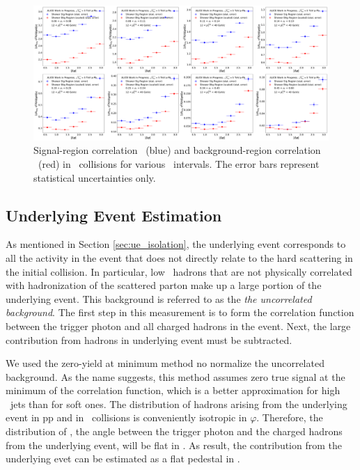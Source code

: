 \begin{figure}
  \centering
  \includegraphics[width = 1.0 \textwidth]{G-H_New/p-Pb_SR_BR_Overlay_pT_0.pdf}
  \caption{Signal-region correlation \CSR~(blue) and background-region correlation \CBR~(red) in \pPb~collisions for various \zt~intervals. The error bars represent statistical uncertainties only.}
  \label{fig:pPb_SR_BR_Overlay_pPb}
\end{figure}
\FloatBarrier


\subsection{Underlying Event Estimation}
\label{sec:ue_subtraction}
As mentioned in Section \ref{sec:ue_isolation}, the underlying event corresponds to all the activity in the event that does not directly relate to the hard scattering in the initial collision. In particular, low \pt~hadrons that are not physically correlated with hadronization of the scattered parton make up a large portion of the underlying event. This background is referred to as the \textit{the uncorrelated background}. The first step in this measurement is to form the correlation function between the trigger photon and all charged hadrons in the event. Next, the large contribution from hadrons in underlying event must be subtracted.

We used the zero-yield at minimum method no normalize the uncorrelated background. As the name suggests, this method assumes zero true signal at the minimum of the correlation function, which is a better approximation for high \pt~jets than for soft ones. The distribution of hadrons arising from the underlying event in pp and in \pPb~collisions is conveniently isotropic in $\varphi$. Therefore, the distribution of \deltaphi, the angle between the trigger photon and the charged hadrons from the underlying event, will be flat in \deltaphi. As result, the contribution from the underlying evet can be estimated as a flat pedestal in \deltaphi.

